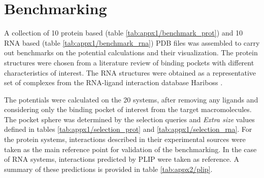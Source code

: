 \section{Benchmarking}
  A collection of 10 protein based (table \ref{tab:appx1/benchmark_prot}) and 10 RNA based (table \ref{tab:appx1/benchmark_rna}) PDB files was assembled to carry out benchmarks on the potential calculations and their visualization. The protein structures were chosen from a literature review of binding pockets with different characteristics of interest. The RNA structures were obtained as a representative set of complexes from the RNA-ligand interaction database Hariboss \cite{hariboss_2022}.

  The potentials were calculated on the 20 systems, after removing any ligands and considering only the binding pocket of interest from the target macromolecules. The pocket sphere was determined by the selection queries and \textit{Extra size} values defined in tables \ref{tab:appx1/selection_prot} and \ref{tab:appx1/selection_rna}. For the protein systems, interactions described in their experimental sources were taken as the main reference point for validation of the benchmarking. In the case of RNA systems, interactions predicted by PLIP \cite{plip_2021} were taken as reference. A summary of these predictions is provided in table \ref{tab:appx2/plip}.

